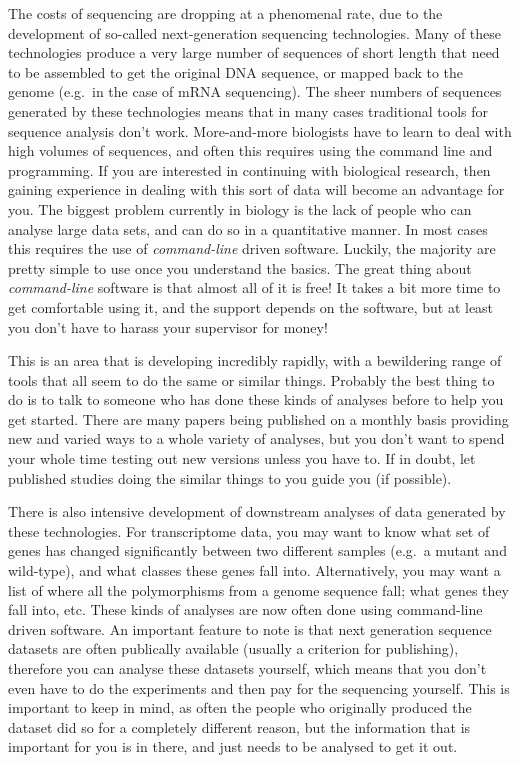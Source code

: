 \documentclass[]{article}
\begin{document}
The costs of sequencing are dropping at a phenomenal rate, due to the
development of so-called next-generation sequencing technologies. Many
of these technologies produce a very large number of sequences of short
length that need to be assembled to get the original DNA sequence, or
mapped back to the genome (e.g.~in the case of mRNA sequencing). The
sheer numbers of sequences generated by these technologies means that in
many cases traditional tools for sequence analysis don't work.
More-and-more biologists have to learn to deal with high volumes of
sequences, and often this requires using the command line and
programming. If you are interested in continuing with biological
research, then gaining experience in dealing with this sort of data will
become an advantage for you. The biggest problem currently in biology is
the lack of people who can analyse large data sets, and can do so in a
quantitative manner. In most cases this requires the use of
\emph{command-line} driven software. Luckily, the majority are pretty
simple to use once you understand the basics. The great thing about
\emph{command-line} software is that almost all of it is free! It takes
a bit more time to get comfortable using it, and the support depends on
the software, but at least you don't have to harass your supervisor for
money!

This is an area that is developing incredibly rapidly, with a
bewildering range of tools that all seem to do the same or similar
things. Probably the best thing to do is to talk to someone who has done
these kinds of analyses before to help you get started. There are many
papers being published on a monthly basis providing new and varied ways
to a whole variety of analyses, but you don't want to spend your whole
time testing out new versions unless you have to. If in doubt, let
published studies doing the similar things to you guide you (if
possible).

There is also intensive development of downstream analyses of data
generated by these technologies. For transcriptome data, you may want to
know what set of genes has changed significantly between two different
samples (e.g.~a mutant and wild-type), and what classes these genes fall
into. Alternatively, you may want a list of where all the polymorphisms
from a genome sequence fall; what genes they fall into, etc. These kinds
of analyses are now often done using command-line driven software. An
important feature to note is that next generation sequence datasets are
often publically available (usually a criterion for publishing),
therefore you can analyse these datasets yourself, which means that you
don't even have to do the experiments and then pay for the sequencing
yourself. This is important to keep in mind, as often the people who
originally produced the dataset did so for a completely different
reason, but the information that is important for you is in there, and
just needs to be analysed to get it out.
\end{document}
